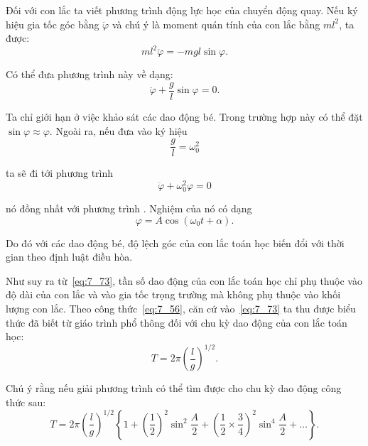 Đối với con lắc ta viết phương trình động lực học của chuyển động quay. Nếu ký hiệu gia tốc góc bằng $\ddot{\varphi}$ và chú ý là moment quán tính của con lắc bằng $ml^2$, ta được:
\begin{equation*}
	ml^2\ddot{\varphi} = -mgl\sin\varphi.
\end{equation*}

\noindent
Có thể đưa phương trình này về dạng:
\begin{equation}\label{eq:7_72}
	\ddot{\varphi} + \frac{g}{l}\sin\varphi = 0.
\end{equation}

Ta chỉ giới hạn ở việc khảo sát các dao động bé. Trong trường hợp này có thể đặt $\sin\varphi\approx\varphi$. Ngoài ra, nếu đưa vào ký hiệu
\begin{equation}\label{eq:7_73}
	\frac{g}{l} = \omega_0^2
\end{equation}

\noindent
ta sẽ đi tới phương trình
\begin{equation}\label{eq:7_74}
	\ddot{\varphi} + \omega_0^2\varphi = 0
\end{equation}

\noindent
nó đồng nhất với phương trình . Nghiệm của nó có dạng
\begin{equation}\label{eq:7_75}
	\varphi = A\cos(\omega_0 t + \alpha).
\end{equation}

\noindent
Do đó với các dao động bé, độ lệch góc của con lắc toán học biến đổi với thời gian theo định luật điều hòa.

Như suy ra từ~\eqref{eq:7_73}, tần số dao động của con lắc toán học chỉ phụ thuộc vào độ dài của con lắc và vào gia tốc trọng trường mà không phụ thuộc vào khối lượng con lắc. Theo công thức~\eqref{eq:7_56}, căn cứ vào~\eqref{eq:7_73} ta thu được biểu thức đã biết từ giáo trình phổ thông đối với chu kỳ dao động của con lắc toán học:
\begin{equation}\label{eq:7_76}
	T = 2\pi\left(\frac{l}{g}\right)^{1/2}.
\end{equation}

Chú ý rằng nếu giải phương trình  có thể tìm được cho chu kỳ dao động công thức sau:
\begin{equation}\label{eq:7_77}
	T = 2\pi\left(\frac{l}{g}\right)^{1/2}\left\{1 + \left(\frac{1}{2}\right)^2 \sin^2\frac{A}{2} + \left(\frac{1}{2}\times\frac{3}{4}\right)^2\sin^4\frac{A}{2} + \ldots\right\}.
\end{equation}

